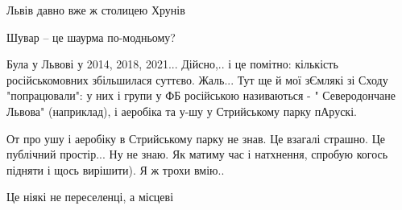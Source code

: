 \begin{itemize}
 
Львів давно вже ж столицею Хрунів

 
Шувар – це шаурма по-модньому?

 

Була у Львові у 2014, 2018, 2021... Дійсно,.. і це помітно: кількість
російськомовних збільшилася суттєво. Жаль... Тут ще й мої зЄмлякі зі Сходу
"попрацювали": у них і групи у ФБ російською називаються - " Северодончане
Львова" (наприклад), і аеробіка та у-шу у Стрийському парку пАрускі.

\begin{itemize}
 

От про ушу і аеробіку в Стрийському парку не знав. Це взагалі страшно. Це
публічний простір... Ну не знаю. Як матиму час і натхнення, спробую когось
підняти і щось вирішити). Я ж трохи вмію..

\end{itemize}

 
Це ніякі не переселенці, а місцеві

 

\end{itemize}
